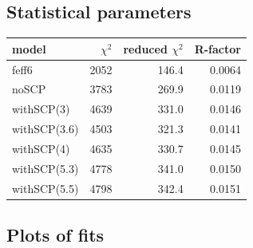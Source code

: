 \documentclass[11pt]{article}
\begin{document}
\subsection{Statistical parameters}
\label{sec:orgheadline15}

\begin{center}
  \begin{tabular}{lrrr}
    model & $\chi^2$ & reduced $\chi^2$ & R-factor\\
    \hline
    feff6        & 2052 & 146.4 & 0.0064\\
    noSCP        & 3783 & 269.9 & 0.0119\\
    withSCP(3)   & 4639 & 331.0 & 0.0146\\
    withSCP(3.6) & 4503 & 321.3 & 0.0141\\
    withSCP(4)   & 4635 & 330.7 & 0.0145\\
    withSCP(5.3) & 4778 & 341.0 & 0.0150\\
    withSCP(5.5) & 4798 & 342.4 & 0.0151\\
  \end{tabular}
\end{center}





\subsection{Plots of fits}
\label{sec:orgheadline17}
\end{document}
